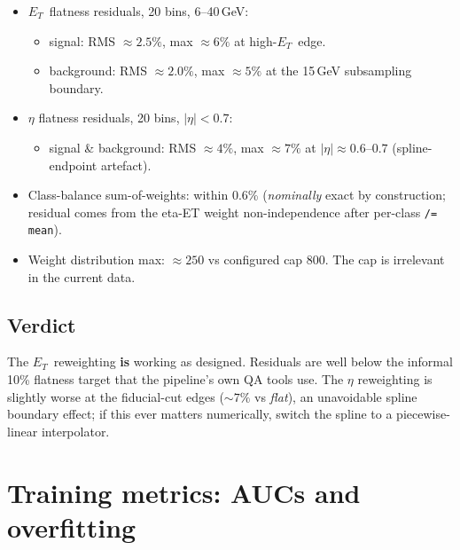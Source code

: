 \documentclass[11pt,a4paper]{article}
\newcommand{\etg}{$E_T$}
\begin{document}
\begin{itemize}
\item \etg\ flatness residuals, 20 bins, 6--40\,GeV:
  \begin{itemize}
    \item signal: RMS $\approx 2.5\%$, max $\approx 6\%$ at high-\etg\ edge.
    \item background: RMS $\approx 2.0\%$, max $\approx 5\%$ at the 15\,GeV
      subsampling boundary.
  \end{itemize}
\item $\eta$ flatness residuals, 20 bins, $|\eta|<0.7$:
  \begin{itemize}
    \item signal \& background: RMS $\approx 4\%$, max $\approx 7\%$ at
      $|\eta|\approx 0.6$--$0.7$ (spline-endpoint artefact).
  \end{itemize}
\item Class-balance sum-of-weights: within 0.6\% (\emph{nominally} exact
  by construction; residual comes from the eta-ET weight
  non-independence after per-class \texttt{/= mean}).
\item Weight distribution max: $\approx 250$ vs configured cap 800.
  The cap is irrelevant in the current data.
\end{itemize}

\subsection{Verdict}

The \etg\ reweighting \textbf{is} working as designed. Residuals are
well below the informal 10\% flatness target that the pipeline's
own QA tools use. The $\eta$ reweighting is slightly worse at the
fiducial-cut edges ($\sim 7\%$ vs \emph{flat}), an unavoidable spline
boundary effect; if this ever matters numerically, switch the spline
to a piecewise-linear interpolator.

\section{Training metrics: AUCs and overfitting}
\end{document}
